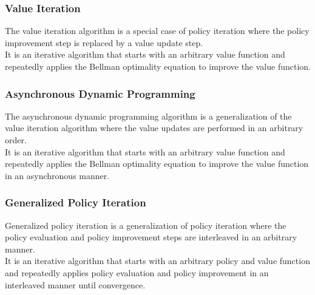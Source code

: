 \documentclass[12pt]{beamer}
\newcommand{\nl}{\vspace*{1em}\\}
\begin{document}
\begin{frame}\frametitle{Value Iteration}
    The value iteration algorithm is a special case of policy iteration where
    the policy improvement step is replaced by a value update step.\nl

    It is an iterative algorithm that starts with an arbitrary value function
    and repeatedly applies the Bellman optimality equation to improve the value function.
\end{frame}

\begin{frame}\frametitle{Asynchronous Dynamic Programming}
    The asynchronous dynamic programming algorithm is a generalization of the value
    iteration algorithm where the value updates are performed in an arbitrary order.\nl

    It is an iterative algorithm that starts with an arbitrary value function and
    repeatedly applies the Bellman optimality equation to improve the
    value function in an asynchronous manner.
\end{frame}

\begin{frame}\frametitle{Generalized Policy Iteration}
    Generalized policy iteration is a generalization of policy iteration where
    the policy evaluation and policy improvement steps are interleaved
    in an arbitrary manner.\nl

    It is an iterative algorithm that starts with an arbitrary policy and
    value function and repeatedly applies policy evaluation and policy improvement
    in an interleaved manner until convergence.
\end{frame}
\end{document}
